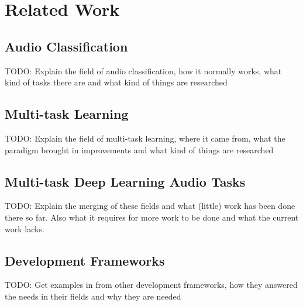 \chapter{Related Work}

\section{Audio Classification}
TODO: Explain the field of audio classification, how it normally works, what kind of tasks there are and what kind of things are researched

\section{Multi-task Learning}
TODO: Explain the field of multi-task learning, where it came from, what the paradigm brought in improvements and what kind of things are researched

\section{Multi-task Deep Learning Audio Tasks}
TODO: Explain the merging of these fields and what (little) work has been done there so far. Also what it requires for more work to be done and what the current work lacks.

\section{Development Frameworks}
TODO: Get examples in from other development frameworks, how they answered the needs in their fields and why they are needed